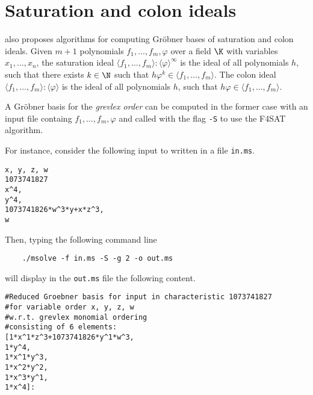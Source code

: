 \documentclass[a4paper,english,11pt]{scrartcl}
\theoremstyle{definition}
\theoremstyle{remark}
\begin{document}
\section{Saturation and colon ideals}\label{sec:f4sat}
\msolve also proposes algorithms for computing Gr\"obner bases of
saturation and colon ideals. Given $m+1$ polynomials
$f_1,\ldots,f_m,\varphi$ over a field $\K$ with variables
$x_1,\ldots,x_n$,
the saturation ideal
$\langle f_1,\ldots,f_m\rangle:\langle \varphi\rangle^{\infty}$ is the ideal of all
polynomials $h$, such that there exists $k\in\N$ such that
$h \varphi^k\in\langle f_1,\ldots,f_m\rangle$.
The colon ideal
$\langle f_1,\ldots,f_m\rangle:\langle \varphi\rangle$ is the ideal of all
polynomials $h$, such that
$h \varphi\in\langle f_1,\ldots,f_m\rangle$.

A Gr\"obner basis for the \emph{grevlex order} can be computed in the
former case with an input file containg $f_1,\ldots,f_m,\varphi$ and
called with the flag \verb+-S+ to use the F4SAT algorithm.

For instance, consider the following input to \msolve written in a file
\verb+in.ms+.
\begin{tcolorbox}
\begin{verbatim}
x, y, z, w 
1073741827
x^4,
y^4,
1073741826*w^3*y+x*z^3,
w
\end{verbatim}  
\end{tcolorbox}
Then, typing the following command line
\begin{tcolorbox}
  \begin{verbatim}
    ./msolve -f in.ms -S -g 2 -o out.ms 
  \end{verbatim}
\end{tcolorbox}
will display in the \verb+out.ms+ file the following content. 
\begin{tcolorbox}
{\tiny\begin{lstlisting}[breaklines]
#Reduced Groebner basis for input in characteristic 1073741827
#for variable order x, y, z, w
#w.r.t. grevlex monomial ordering
#consisting of 6 elements:
[1*x^1*z^3+1073741826*y^1*w^3,
1*y^4,
1*x^1*y^3,
1*x^2*y^2,
1*x^3*y^1,
1*x^4]:
\end{lstlisting}}
\end{tcolorbox}



\end{document}

